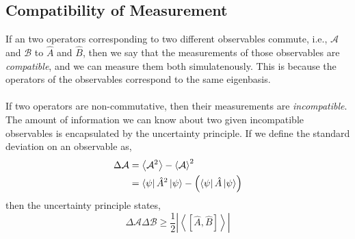 \documentclass{book}
\begin{document}
\subsection{Compatibility of Measurement}
If an two operators corresponding to two different observables commute, i.e., $\mathcal{A}$ and $\mathcal{B}$ to $\hat{A}$ and $\hat{B}$, then we say that the measurements of those observables are \textit{compatible}, and we can measure them both simulatenously. This is because the operators of the observables correspond to the same eigenbasis.
\\\\
If two operators are non-commutative, then their measurements are \textit{incompatible}. The amount of information we can know about two given incompatible observables is encapsulated by the uncertainty principle. If we define the standard deviation on an observable as,
\begin{equation}
	\begin{split}
	\Delta \mathcal{A} &= \left<\mathcal{A}^2\right> - \left<\mathcal{A}\right>^2 \\
	& = \bra{\psi}\hat{A}^2\ket{\psi} - \left(\bra{\psi}\hat{A}\ket{\psi}\right)
	\end{split}
\end{equation}
then the uncertainty principle states,
\begin{equation}
	\Delta\mathcal{A}\Delta\mathcal{B} \geq \frac{1}{2}\left|\left<\left[\hat{A},\hat{B}\right]\right>\right|
\end{equation}
\end{document}
